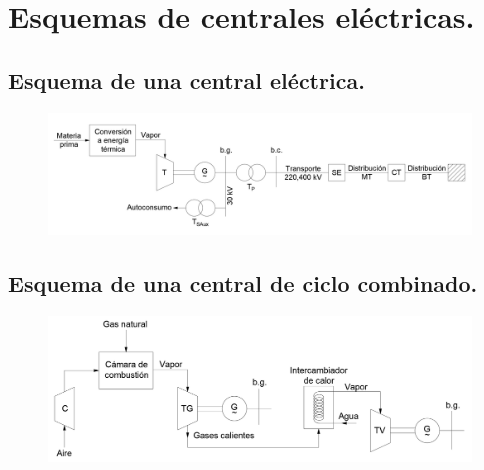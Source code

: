 \section{Esquemas de centrales eléctricas.}
\subsection{Esquema de una central eléctrica.}
	\begin{figure}[H]
		\centering
		\includegraphics[width=1\linewidth]{res/tema1/esquemaCentral}
	\end{figure}
\subsection{Esquema de una central de ciclo combinado.}
	\begin{figure}[H]
		\centering
		\includegraphics[width=1\linewidth]{res/tema1/esquemaCC}
	\end{figure}
	